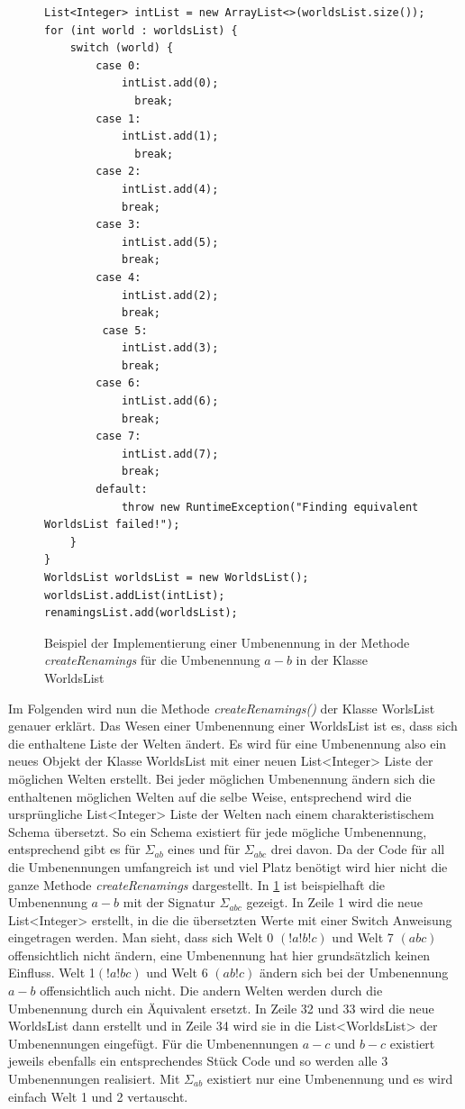 \documentclass[12pt,a4paper]{article}
\begin{document}
\begin{figure}
\begin{lstlisting}
List<Integer> intList = new ArrayList<>(worldsList.size());
for (int world : worldsList) {
    switch (world) {
        case 0:
            intList.add(0);
              break;
        case 1:
            intList.add(1);
              break;
        case 2:
            intList.add(4);
            break;
        case 3:
            intList.add(5);
            break;
        case 4:
            intList.add(2);
            break;
         case 5:
            intList.add(3);
            break;
        case 6:
            intList.add(6);
            break;
        case 7:
            intList.add(7);
            break;
        default:
            throw new RuntimeException("Finding equivalent WorldsList failed!");
    }
}
WorldsList worldsList = new WorldsList();
worldsList.addList(intList);
renamingsList.add(worldsList);
\end{lstlisting}
\caption{Beispiel der Implementierung einer Umbenennung in der Methode \textit{createRenamings} für die Umbenennung $a-b$ in der Klasse WorldsList}
\label{code:renaming}
\end{figure}


Im Folgenden wird nun die Methode \textit{createRenamings()} der Klasse WorlsList genauer erklärt. Das Wesen einer Umbenennung einer WorldsList ist es, dass sich die enthaltene Liste der Welten ändert. Es wird für eine Umbenennung also ein neues Objekt der Klasse WorldsList mit einer neuen List<Integer> Liste der möglichen Welten erstellt. Bei jeder möglichen Umbenennung ändern sich die enthaltenen möglichen Welten auf die selbe Weise, entsprechend wird die ursprüngliche List<Integer> Liste der Welten nach einem charakteristischem Schema \glqq übersetzt\grqq. So ein Schema existiert für jede mögliche Umbenennung, entsprechend gibt es für $\Sigma_{ab}$ eines und für $\Sigma_{abc}$ drei davon. Da der Code für all die Umbenennungen umfangreich ist und viel Platz benötigt wird hier nicht die ganze Methode \textit{createRenamings} dargestellt. In \ref{code:renaming} ist beispielhaft die Umbenennung $a-b$ mit der Signatur $\Sigma_{abc}$ gezeigt. In Zeile 1 wird die neue List<Integer> erstellt, in die die übersetzten Werte mit einer Switch Anweisung eingetragen werden. Man sieht, dass sich  Welt 0 $(!a!b!c)$ und Welt 7 $(abc)$ offensichtlich nicht ändern, eine Umbenennung hat hier grundsätzlich keinen Einfluss. Welt 1$(!a!bc)$ und Welt 6 $(ab!c)$ ändern sich bei der Umbenennung $a-b$ offensichtlich auch nicht. Die andern Welten werden durch die Umbenennung durch ein Äquivalent ersetzt. In Zeile 32 und 33 wird die neue WorldsList dann erstellt und in Zeile 34 wird sie in die List<WorldsList> der Umbenennungen eingefügt.  Für die Umbenennungen $a-c$ und $b-c$ existiert jeweils ebenfalls ein entsprechendes Stück Code und so werden alle 3 Umbenennungen realisiert. Mit $\Sigma_{ab}$ existiert nur eine Umbenennung und es wird einfach Welt 1 und 2 vertauscht.
\end{document}
